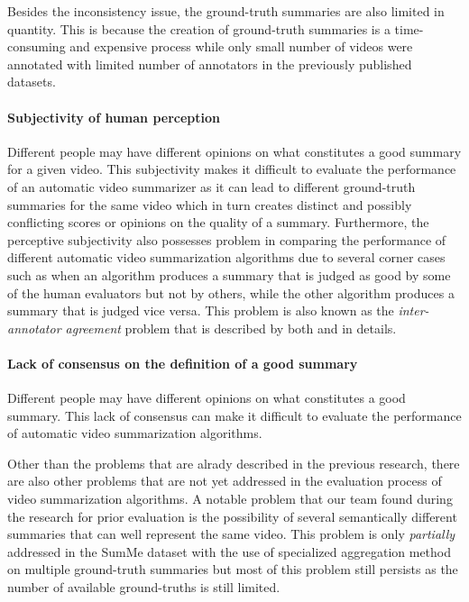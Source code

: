 				Besides the inconsistency issue, the ground-truth summaries are also limited in quantity. This is because the creation of ground-truth summaries is a time-consuming and expensive process while only small number of videos were annotated with limited number of annotators in the previously published datasets.
			
			\paragraph[short]{Subjectivity of human perception}
				Different people may have different opinions on what constitutes a good summary for a given video. This subjectivity makes it difficult to evaluate the performance of an automatic video summarizer as it can lead to different ground-truth summaries for the same video which in turn creates distinct and possibly conflicting scores or opinions on the quality of a summary. Furthermore, the perceptive subjectivity also possesses problem in comparing the performance of different automatic video summarization algorithms due to several corner cases such as when an algorithm produces a summary that is judged as good by some of the human evaluators but not by others, while the other algorithm produces a summary that is judged vice versa. This problem is also known as the \textit{inter-annotator agreement} problem that is described by both \cite{measure-annotator-agreement} and \cite{inter-annotator-agreement} in details.
			
			\paragraph[short]{Lack of consensus on the definition of a good summary}
				Different people may have different opinions on what constitutes a good summary. This lack of consensus can make it difficult to evaluate the performance of automatic video summarization algorithms.

		Other than the problems that are alrady described in the previous research, there are also other problems that are not yet addressed in the evaluation process of video summarization algorithms. A notable problem that our team found during the research for prior evaluation is the possibility of several semantically different summaries that can well represent the same video. This problem is only \textit{partially} addressed in the SumMe dataset with the use of specialized aggregation method on multiple ground-truth summaries but most of this problem still persists as the number of available ground-truths is still limited.

